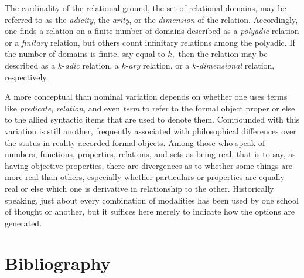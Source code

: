 \documentclass[12pt]{article}
\begin{document}
The cardinality of the relational ground, the set of relational domains, may be referred to as the \emph{adicity}, the \emph{arity}, or the \emph{dimension} of the relation.  Accordingly, one finds a relation on a finite number of domains described as a \emph{polyadic} relation or a \emph{finitary} relation, but others count infinitary relations among the polyadic.  If the number of domains is finite, say equal to $k,$ then the relation may be described as a $k$-\emph{adic} relation, a $k$-\emph{ary} relation, or a $k$-\emph{dimensional} relation, respectively.

A more conceptual than nominal variation depends on whether one uses terms like \emph{predicate}, \emph{relation}, and even \emph{term} to refer to the formal object proper or else to the allied syntactic items that are used to denote them.  Compounded with this variation is still another, frequently associated with philosophical differences over the status in reality accorded formal objects.  Among those who speak of numbers, functions, properties, relations, and sets as being real, that is to say, as having objective properties, there are divergences as to whether some things are more real than others, especially whether particulars or properties are equally real or else which one is derivative in relationship to the other.  Historically speaking, just about every combination of modalities has been used by one school of thought or another, but it suffices here merely to indicate how the options are generated.

\section{Bibliography}
\end{document}
